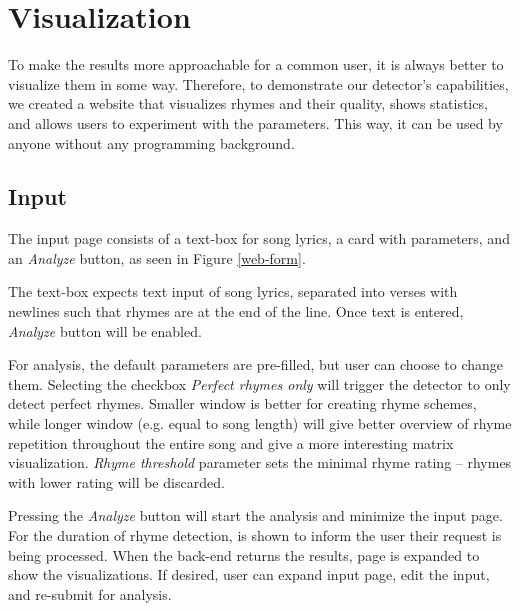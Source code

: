 \chapter{Visualization}\label{visualization}
To make the results more approachable for a common user, it is always better to visualize them in some way. Therefore, to demonstrate our detector's capabilities, we created a website that visualizes rhymes and their quality, shows statistics, and allows users to experiment with the parameters. This way, it can be used by anyone without any programming background.

\section{Input}
The input page consists of a text-box for song lyrics, a card with parameters, and an \textit{Analyze} button, as seen in Figure \ref{web-form}.

The text-box expects text input of song lyrics, separated into verses with newlines such that rhymes are at the end of the line. Once text is entered, \textit{Analyze} button will be enabled.

For analysis, the default parameters are pre-filled, but user can choose to change them. Selecting the checkbox \textit{Perfect rhymes only} will trigger the detector to only detect perfect rhymes.
Smaller window is better for creating rhyme schemes, while longer window (e.g. equal to  song length) will give better overview of rhyme repetition throughout the entire song and give a more interesting matrix visualization. \textit{Rhyme threshold} parameter sets the minimal rhyme rating -- rhymes with lower rating will be discarded.

Pressing the \textit{Analyze} button will start the analysis and minimize the input page. For the duration of rhyme detection,  is shown to inform the user their request is being processed. When the back-end returns the results,  page is expanded to show the visualizations. If desired, user can expand  input page, edit the input, and re-submit for analysis.

